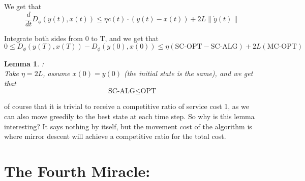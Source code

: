 \documentclass[11pt]{book} %
\newtheorem{lemma}{Lemma}[section]
\begin{document}
We get that 
\[
  \frac{d}{dt}D_{\phi}(y(t), x(t)) \leq \eta c(t) \cdot (y(t) - x(t)) + 2L \| \dot{y}(t) \|
\]

Integrate both sides from 0 to T, and we get that
\[
  0 \leq D_{\phi}(y(T), x(T)) - D_{\phi}(y(0), x(0)) \leq \eta (\text{SC-OPT} - \text{SC-ALG}) + 2L  (\text{MC-OPT})
\]


\begin{lemma}{:} \\ 
    Take $\eta = 2L$, assume $x(0) = y(0)$ (the initial state is the same), and we get that
    \[
      \text{SC-ALG} \leq \text{OPT}
    \]    
\end{lemma}

of course that it is trivial to receive a competitive ratio of service cost 1, as we can also move greedily to the best state at each time step.
So why is this lemma interesting? 
It says nothing by itself, but the movement cost of the algorithm is where mirror descent will achieve a competitive ratio for the total cost.




\chapter{The Fourth Miracle: }

\end{document}
